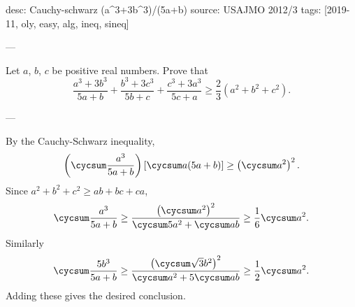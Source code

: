 desc: Cauchy-schwarz (a^3+3b^3)/(5a+b)
source: USAJMO 2012/3
tags: [2019-11, oly, easy, alg, ineq, sineq]

---

Let $a$, $b$, $c$ be positive real numbers. Prove that \[\frac{a^3+3b^3}{5a+b}+\frac{b^3+3c^3}{5b+c}+\frac{c^3+3a^3}{5c+a}\ge\frac23\left(a^2+b^2+c^2\right).\]

---

By the Cauchy-Schwarz inequality, \[\left(\cycsum\frac{a^3}{5a+b}\right)\left[\cycsum a(5a+b)\right]\ge\left(\cycsum a^2\right)^2.\]
Since $a^2+b^2+c^2\ge ab+bc+ca$, \[\cycsum\frac{a^3}{5a+b}\ge\frac{\left(\cycsum a^2\right)^2}{\cycsum5a^2+\cycsum ab}\ge\frac16\cycsum a^2.\]
Similarly \[\cycsum\frac{5b^3}{5a+b}\ge\frac{\left(\cycsum\sqrt3b^2\right)^2}{\cycsum a^2+5\cycsum ab}\ge\frac12\cycsum a^2.\]
Adding these gives the  desired conclusion.
